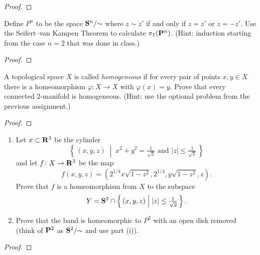 \begin{proof}
\end{proof}
\newpage
\begin{problem}[A]
Define $P^n$ to be the space $\mathbf{S}^n/{\sim}$ where $z\sim z'$ if and only
if $z=z'$ or $z=-z'$. Use the Seifert--van Kampen Theorem to calculate
$\pi_1(\mathbf{P}^n)$. (Hint: induction starting from the case $n=2$ that was
done in class.)
\end{problem}
\begin{proof}
\end{proof}
\newpage
\begin{problem}[B]
A topological space $X$ is called \emph{homogeneous} if for every pair of
points $x,y\in X$ there is a homeomorphism $\varphi\colon X\to X$ with
$\varphi(x)=y$. Prove that every connected $2$-manifold is
homogeneous. (Hint: use the optional problem from the previous assignment.)
\end{problem}
\begin{proof}
\end{proof}
\newpage
\begin{problem}
\begin{enumerate}[label=(\roman*)]
\item Let $x\subset\mathbf{R}^3$ be the cylinder
\[
\left\{\,(x,y,z)\;\middle|\;
\text{$x^2+y^2=\tfrac{1}{\sqrt{2}}$ and $|z|\leq \tfrac{1}{\sqrt{2}}$}\,\right\}
\]
and let $f\colon X\to\mathbf{R}^3$ be the map
\[
f(x,y,z)=\left(2^{1/4}x\sqrt{1-z^2},2^{1/4},y\sqrt{1-z^2},z\right).
\]
Prove that $f$ is a homeomorphism from $X$ to the subspace
\[
Y=\mathbf{S}^2\cap\left\{\,(x,y,z)\;\middle|\;|z|\leq\tfrac{1}{\sqrt{2}}\,\right\}.
\]
\item Prove that the  band is homeomorphic to $P^2$ with an
  open disk removed (think of $\mathbf{P}^2$ as $\mathbf{S}^2/{\sim}$ and use part (i)).
\end{enumerate}
\end{problem}
\begin{proof}
\end{proof}

